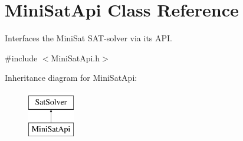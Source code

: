 \hypertarget{classMiniSatApi}{\section{Mini\-Sat\-Api Class Reference}
\label{classMiniSatApi}
}


Interfaces the Mini\-Sat S\-A\-T-\/solver via its A\-P\-I.  




{\ttfamily \#include $<$Mini\-Sat\-Api.\-h$>$}

Inheritance diagram for Mini\-Sat\-Api\-:\begin{figure}[H]
\begin{center}
\leavevmode
\includegraphics[height=2.000000cm]{classMiniSatApi}
\end{center}
\end{figure}
